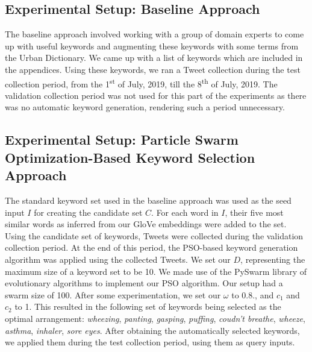 \documentclass[runningheads]{llncs}
\begin{document}
\subsection{Experimental Setup: Baseline Approach}
The baseline approach involved working with a group of domain experts to come up with useful keywords and augmenting these keywords with some terms from the Urban Dictionary. We came up with a list of keywords which are included in the appendices. Using these keywords, we ran a Tweet collection during the test collection period, from the 1\textsuperscript{st} of July, 2019, till the 8\textsuperscript{th} of July, 2019. The validation collection period was not used for this part of the experiments as there was no automatic keyword generation, rendering such a period unnecessary.

\subsection{Experimental Setup: Particle Swarm Optimization-Based Keyword Selection Approach}
The standard keyword set used in the baseline approach was used as the seed input $I$ for creating the candidate set $C$. For each word in $I$, their five most similar words as inferred from our GloVe embeddings were added to the set. Using the candidate set of keywords, Tweets were collected during the validation collection period. At the end of this period, the PSO-based keyword generation algorithm was applied using the collected Tweets. We set our $D$, representing the maximum size of a keyword set to be 10. We made use of the PySwarm library of evolutionary algorithms to implement our PSO algorithm. Our setup had a swarm size of 100. After some experimentation, we set our $\omega$ to 0.8., and $c_1$ and $c_2$ to 1. This resulted in the following set of keywords being selected as the optimal arrangement: \textit{wheezing}, \textit{panting}, \textit{gasping}, \textit{puffing}, \textit{coudn't breathe}, \textit{wheeze}, \textit{asthma}, \textit{inhaler}, \textit{sore eyes}.
After obtaining the automatically selected keywords, we applied them during the test collection period, using them as query inputs.
\end{document}
